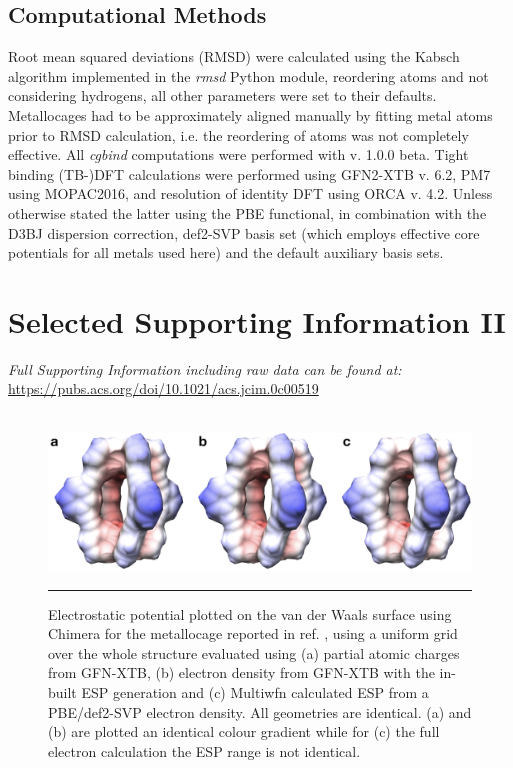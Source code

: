 \documentclass[../../main.tex]{subfiles}
\newcommand{\cgbind}{\emph{cgbind }}
\begin{document}
\subsection{Computational Methods}

Root mean squared deviations (RMSD) were calculated using the Kabsch algorithm implemented in the \emph{rmsd} Python module,\cite{Kromann2019} reordering atoms and not considering hydrogens, all other parameters were set to their defaults. Metallocages had to be approximately aligned manually by fitting metal atoms prior to RMSD calculation, i.e. the reordering of atoms was not completely effective. All \cgbind computations were performed with v. 1.0.0 beta. Tight binding (TB-)DFT calculations were performed using GFN2-XTB v. 6.2,\cite{Bannwarth2019} PM7 using MOPAC2016,\cite{Stewart2016} and resolution of identity DFT using ORCA v. 4.2.\cite{Neese2017} Unless otherwise stated the latter using the PBE functional,\cite{Perdew1996} in combination with the D3BJ dispersion correction,\cite{Grimme2010, Grimme2011} def2-SVP basis set\cite{Weigend2005} (which employs effective core potentials for all metals used here)\cite{Andrae1990} and the default auxiliary basis sets.\cite{Weigend2006}


\clearpage
\section{Selected Supporting Information II}
\emph{Full Supporting Information including raw data can be found at:}\\ {\url{https://pubs.acs.org/doi/10.1021/acs.jcim.0c00519}}
\\\\


\begin{figure}[h!]
	\vspace{0.4cm}
	\centering
	\includegraphics[width=\textwidth]{3/cgbind/figs/figS1}
	\vspace{0.2cm}
	\hrule
	\caption{Electrostatic potential plotted on the van der Waals surface using Chimera for the metallocage reported in ref. \cite{August2016}, using a uniform grid over the whole structure evaluated using (a) partial atomic charges from GFN-XTB, (b) electron density from GFN-XTB with the in-built ESP generation and (c) Multiwfn calculated ESP from a PBE/def2-SVP electron density. All geometries are identical. (a) and (b) are plotted an identical colour gradient while for (c) the full electron calculation the ESP range is not identical.}
	\label{fig::si_cg_1}
\end{figure}
\end{document}

